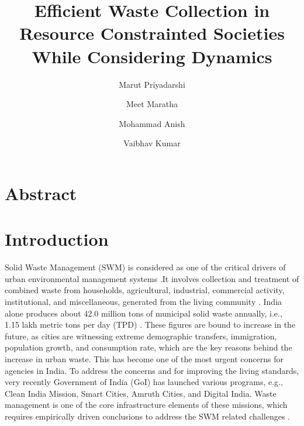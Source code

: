 \documentclass[12pt]{article}
\begin{document}


\title{Efficient Waste Collection in Resource Constrainted Societies While Considering Dynamics\\}
\date{}
\author[1]{Marut Priyadarshi}
\author[1]{Meet Maratha}
\author[2]{Mohammad Anish}
\author[1*]{Vaibhav Kumar}


\maketitle
\section{Abstract}
\pagebreak
\section{Introduction}

Solid Waste Management (SWM) is considered as one of the critical drivers of urban environmental management systems \parencite{hoornweg2012waste}.It involves collection and treatment of combined waste from households, agricultural, industrial, commercial activity, institutional, and miscellaneous, generated from the living community \parencite{GUPTA2015206}. India alone produces about 42.0 million tons of municipal solid waste annually, i.e., 1.15 lakh metric tons per day (TPD) \parencite{SHARMA2021293,GUPTA2015206}. These figures are bound to increase in the future, as cities are witnessing extreme demographic transfers, immigration, population growth, and consumption rate, which are the key reasons behind the increase in urban waste. This has become one of the most urgent concerns for agencies in India. To address the concerns and for improving the living standards, very recently Government of India (GoI) has launched various programs, e.g., Clean India Mission, Smart Cities, Amruth Cities, and Digital India. Waste management is one of the core infrastructure elements of these missions, which requires empirically driven conclusions to address the SWM related challenges \parencite{CHEELA2021419}. 
\end{document}
